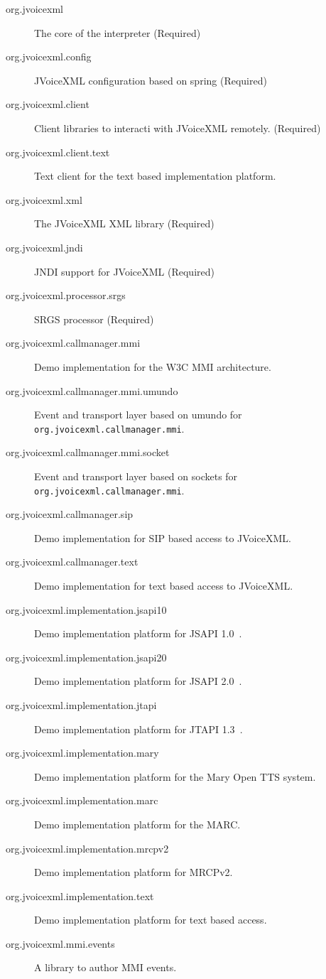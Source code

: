 \documentclass[11pt,a4paper]{article}
\begin{document}
\begin{description}
\item[org.jvoicexml] The core of the interpreter (Required)
\item[org.jvoicexml.config] JVoiceXML configuration based on spring (Required)
\item[org.jvoicexml.client] Client libraries to interacti with JVoiceXML remotely. (Required)
\item[org.jvoicexml.client.text] Text client for the text based
implementation platform.
\item[org.jvoicexml.xml] The JVoiceXML XML library (Required)
\item[org.jvoicexml.jndi] JNDI support for JVoiceXML (Required)
\item[org.jvoicexml.processor.srgs] SRGS processor (Required)
\item[org.jvoicexml.callmanager.mmi] Demo implementation for the W3C MMI
architecture.
\item[org.jvoicexml.callmanager.mmi.umundo] Event and transport layer
based on umundo for \texttt{org.jvoicexml.callmanager.mmi}.
\item[org.jvoicexml.callmanager.mmi.socket] Event and transport layer
based on sockets for \texttt{org.jvoicexml.callmanager.mmi}.
\item[org.jvoicexml.callmanager.sip] Demo implementation for SIP based access to
JVoiceXML.
\item[org.jvoicexml.callmanager.text] Demo implementation for text based access to
JVoiceXML.
\item[org.jvoicexml.implementation.jsapi10] Demo implementation platform for
JSAPI 1.0~\cite{sun:jsapi}.
\item[org.jvoicexml.implementation.jsapi20] Demo implementation platform for
JSAPI 2.0~\cite{jcp:jsr113}.
\item[org.jvoicexml.implementation.jtapi] Demo implementation platform for
JTAPI 1.3~\cite{sun:jtapi}.
\item[org.jvoicexml.implementation.mary] Demo implementation platform for
the Mary Open TTS system.
\item[org.jvoicexml.implementation.marc] Demo implementation platform for
the MARC.
\item[org.jvoicexml.implementation.mrcpv2] Demo implementation platform for
MRCPv2.
\item[org.jvoicexml.implementation.text] Demo implementation platform for
text based access.
\item[org.jvoicexml.mmi.events] A library to author MMI events.
\end{description}
\end{document}
